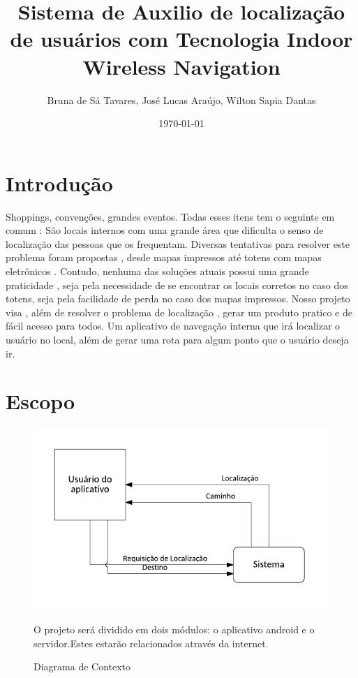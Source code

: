 \documentclass[13pt]{article}
\begin{document}
\title{Sistema de Auxilio de localização de usuários com Tecnologia Indoor Wireless Navigation}
\author{Bruna de Sá Tavares, José Lucas Araújo, Wilton Sapia Dantas}
\date{\today}
\maketitle  

\section*{Introdução}
	Shoppings, convenções,  grandes eventos. Todas esses itens tem o seguinte em comum : São locais internos com uma grande área  que dificulta o senso de localização das pessoas que os frequentam.  Diversas tentativas para resolver este problema foram propostas , desde mapas impressos até totens com mapas eletrônicos . Contudo, nenhuma das soluções atuais possui uma grande praticidade , seja pela necessidade de se encontrar os locais corretos no caso dos totens, seja pela facilidade de perda no caso dos mapas impressos. Nosso projeto visa , além de resolver o problema de localização , gerar um produto pratico e de fácil acesso para todos. Um aplicativo de navegação interna que irá localizar o usuário no local, além de gerar uma rota para algum ponto que o usuário deseja ir.

\section*{Escopo}
	\begin{figure}[!htb]
		\centering
		\includegraphics{diagramaContexto.PNG}
		\caption{Diagrama de Contexto}
		O projeto será dividido em dois módulos: o aplicativo android e o servidor.Estes estarão relacionados através da internet.
		\end{figure}
\\
\\
\end{document}
